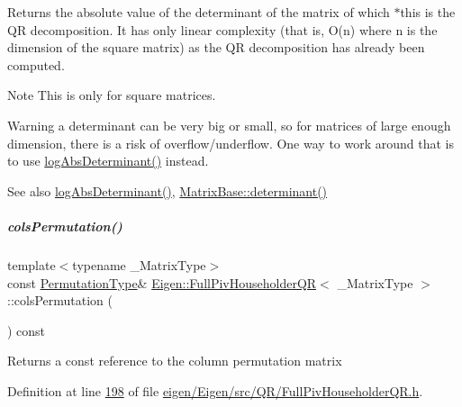 \begin{DoxyReturn}{Returns}
the absolute value of the determinant of the matrix of which $\ast$this is the QR decomposition. It has only linear complexity (that is, O(n) where n is the dimension of the square matrix) as the QR decomposition has already been computed.
\end{DoxyReturn}
\begin{DoxyNote}{Note}
This is only for square matrices.
\end{DoxyNote}
\begin{DoxyWarning}{Warning}
a determinant can be very big or small, so for matrices of large enough dimension, there is a risk of overflow/underflow. One way to work around that is to use \hyperlink{group___q_r___module_aafde38918912c9b562f44b0fc3b22589}{log\+Abs\+Determinant()} instead.
\end{DoxyWarning}
\begin{DoxySeeAlso}{See also}
\hyperlink{group___q_r___module_aafde38918912c9b562f44b0fc3b22589}{log\+Abs\+Determinant()}, \hyperlink{group___core___module_a7ad8f77004bb956b603bb43fd2e3c061}{Matrix\+Base\+::determinant()} 
\end{DoxySeeAlso}
\mbox{\label{group___q_r___module_abeda6d91e196c13d4dd8b7542fef3e17}} 
\subparagraph{\texorpdfstring{cols\+Permutation()}{colsPermutation()}\hspace{0.1cm}{\footnotesize\ttfamily [1/2]}}
{\footnotesize\ttfamily template$<$typename \+\_\+\+Matrix\+Type$>$ \\
const \hyperlink{group___core___module}{Permutation\+Type}\& \hyperlink{group___q_r___module_class_eigen_1_1_full_piv_householder_q_r}{Eigen\+::\+Full\+Piv\+Householder\+QR}$<$ \+\_\+\+Matrix\+Type $>$\+::cols\+Permutation (\begin{DoxyParamCaption}{ }\end{DoxyParamCaption}) const\hspace{0.3cm}{\ttfamily [inline]}}

\begin{DoxyReturn}{Returns}
a const reference to the column permutation matrix 
\end{DoxyReturn}


Definition at line \hyperlink{eigen_2_eigen_2src_2_q_r_2_full_piv_householder_q_r_8h_source_l00198}{198} of file \hyperlink{eigen_2_eigen_2src_2_q_r_2_full_piv_householder_q_r_8h_source}{eigen/\+Eigen/src/\+Q\+R/\+Full\+Piv\+Householder\+Q\+R.\+h}.

